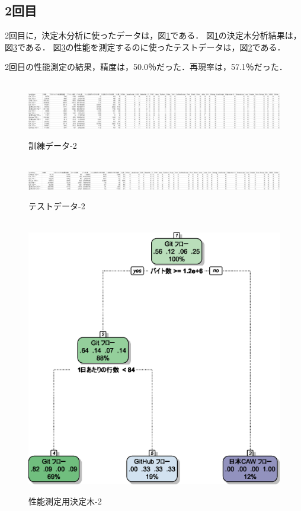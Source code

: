 \subsection{2回目}
2回目に，決定木分析に使ったデータは，図\ref{データ2-1}である．
図\ref{データ2-1}の決定木分析結果は，図\ref{決定木2}である．
図\ref{決定木2}の性能を測定するのに使ったテストデータは，図\ref{データ2-2}である．


2回目の性能測定の結果，精度は，50.0％だった．再現率は，57.1％だった．

\begin{figure}[H]
\centering　
\includegraphics[width=13cm]{2-1.png}
\caption{訓練データ-2}\label{データ2-1}
\end{figure}
\begin{figure}[H]
\centering　
\includegraphics[width=13cm]{2-2.png}
\caption{テストデータ-2}\label{データ2-2}
\end{figure}
\begin{figure}[H]
\centering　
\includegraphics[width=13cm]{2.eps}
\caption{性能測定用決定木-2}\label{決定木2}
\end{figure}


